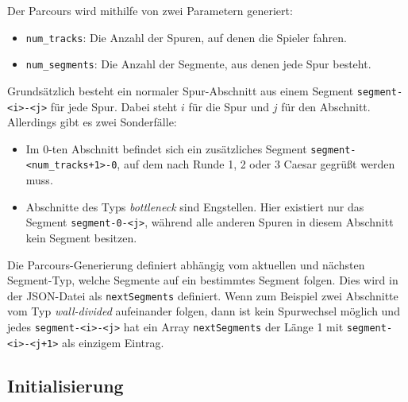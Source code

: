 \documentclass[]{article}
\begin{document}
Der Parcours wird mithilfe von zwei Parametern generiert:
\begin{itemize}
    \item \texttt{num\_tracks}: Die Anzahl der Spuren, auf denen die Spieler fahren.
    \item \texttt{num\_segments}: Die Anzahl der Segmente, aus denen jede Spur besteht.
\end{itemize}
Grundsätzlich besteht ein normaler Spur-Abschnitt aus einem Segment \texttt{segment-<i>-<j>} für jede Spur. Dabei steht $i$ für die Spur und $j$ für den Abschnitt. Allerdings gibt es zwei Sonderfälle:
\begin{itemize}
    \item Im $0$-ten Abschnitt befindet sich ein zusätzliches Segment \texttt{segment-<num\_tracks+1>-0}, auf dem nach Runde 1, 2 oder 3 Caesar gegrüßt werden muss.
    \item Abschnitte des Typs \emph{bottleneck} sind Engstellen. Hier existiert nur das Segment \texttt{segment-0-<j>}, während alle anderen Spuren in diesem Abschnitt kein Segment besitzen.
\end{itemize}
Die Parcours-Generierung definiert abhängig vom aktuellen und nächsten Segment-Typ, welche Segmente auf ein bestimmtes Segment folgen. Dies wird in der JSON-Datei als \texttt{nextSegments} definiert. Wenn zum Beispiel zwei Abschnitte vom Typ \emph{wall-divided} aufeinander folgen, dann ist kein Spurwechsel möglich und jedes \texttt{segment-<i>-<j>} hat ein Array \texttt{nextSegments} der Länge 1 mit \texttt{segment-<i>-<j+1>} als einzigem Eintrag.

\subsection{Initialisierung}
\label{subsec:initialisierung}
\end{document}
